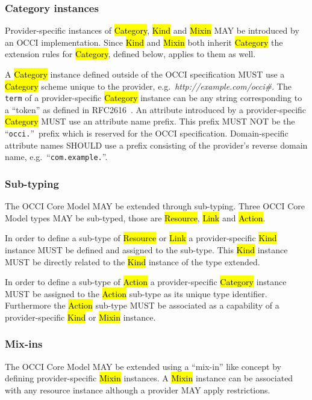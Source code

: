 \documentclass[10pt,a4paper]{article}
\begin{document}
\subsubsection{Category instances}
\label{sec:ext:category}
Provider-specific instances of \hl{Category}, \hl{Kind} and \hl{Mixin} MAY be
introduced by an OCCI implementation. Since \hl{Kind} and \hl{Mixin} both
inherit \hl{Category} the extension rules for \hl{Category}, defined below,
applies to them as well.

A \hl{Category} instance defined outside of the OCCI specification MUST use a
\hl{Category} scheme unique to the provider,
e.g.~\textit{http://example.com/occi\#}. The {\tt term} of a provider-specific
\hl{Category} instance can be any string corresponding to a ``token'' as defined
in RFC2616~\cite{rfc2616}.
%
An attribute introduced by a provider-specific \hl{Category} MUST
use an attribute name prefix. This prefix MUST NOT be the ``\texttt{occi.}''~prefix
which is reserved for the OCCI specification. Domain-specific attribute names
SHOULD use a prefix consisting of the provider's reverse domain name,
e.g.~``\texttt{com.example.}''.

\subsubsection{Sub-typing}
The OCCI Core Model MAY be extended through sub-typing.
Three OCCI Core Model types MAY be sub-typed, those are \hl{Resource}, \hl{Link} and
\hl{Action}.

In order to define a sub-type of \hl{Resource} or \hl{Link} a provider-specific
\hl{Kind} instance MUST be defined and assigned to the sub-type. This
\hl{Kind} instance MUST be directly related to the \hl{Kind} instance of the
type extended.

In order to define a sub-type of \hl{Action} a provider-specific \hl{Category}
instance MUST be assigned to the \hl{Action} sub-type as its unique type identifier.
Furthermore the \hl{Action} sub-type MUST be associated as a capability of a
provider-specific \hl{Kind} or \hl{Mixin} instance.

\subsubsection{Mix-ins}
The OCCI Core Model MAY be extended using a ``mix-in'' like concept
by defining
provider-specific \hl{Mixin} instances.  A \hl{Mixin} instance can be associated
with any resource instance although a provider MAY apply restrictions.
\end{document}
